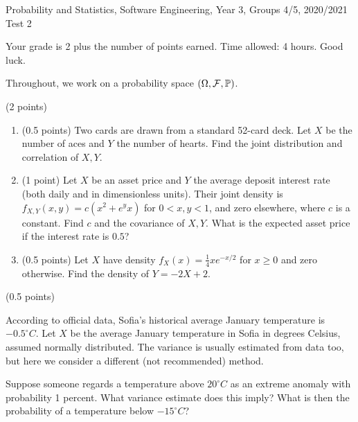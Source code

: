 \documentclass[a4paper]{report}
\begin{document}
\noindent Probability and Statistics, Software Engineering, Year 3, Groups 4/5, 2020/2021 \hfill Test 2

\hrulefill

\begin{it}
Your grade is 2 plus the number of points earned. Time allowed: 4 hours. Good luck.

Throughout, we work on a probability space $(\Omega, {\mathcal{F}}, \mathbb P)$.

\end{it}

\begin{problem} (2 points)
\begin{enumerate}
    \item (0.5 points) Two cards are drawn from a standard 52-card deck. Let $X$ be the number of aces and $Y$ the number of hearts. Find the joint distribution and correlation of $X,Y$.





\item (1 point)
Let $X$ be an asset price and $Y$ the average deposit interest rate (both daily and in dimensionless units). Their joint density is
$f_{X,Y}(x,y)=c(x^2+e^yx)$ for $0<x,y<1$, and zero elsewhere, where $c$ is
a constant. Find
$c$ and the covariance of $X,Y$. What is the expected asset price if
the interest rate
is $0.5$?




\item (0.5 points) Let $X$ have density $f_X(x)=\frac14xe^{-x/2}$ for $x\geq0$ and
zero otherwise. Find the density of $Y=-2X+2$.


    \end{enumerate}
\end{problem}


\begin{problem}(0.5 points)

According to official data, Sofia's historical average January temperature is $-0.5^\circ C$. Let $X$ be the average January temperature in Sofia in degrees Celsius, assumed normally distributed. The variance is usually estimated
from data too, but here we consider a different (not recommended) method.

Suppose someone regards a temperature above $20^\circ C$ as an extreme anomaly
with probability 1 percent. What variance estimate does this imply? What
is then the probability of a temperature below $-15^\circ C$?

\end{problem}
\end{document}
